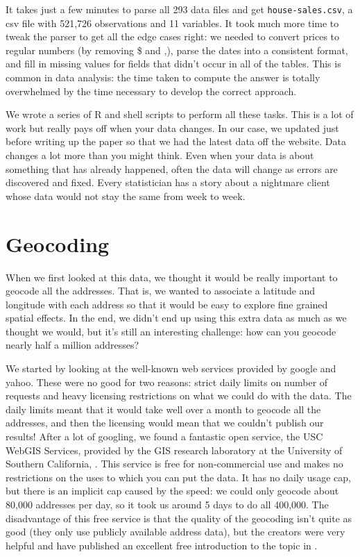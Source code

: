 \documentclass[oneside]{article}
\begin{document}
It takes just a few minutes to parse all 293 data files and get {\tt house-sales.csv}, a csv file with 521,726 observations and 11 variables.  It took much more time to tweak the parser to get all the edge cases right: we needed to convert prices to regular numbers (by removing \$ and ,), parse the dates into a consistent format, and fill in missing values for fields that didn't occur in all of the tables.  This is common in data analysis: the time taken to compute the answer is totally overwhelmed by the time necessary to develop the correct approach.

We wrote a series of R and shell scripts to perform all these tasks. This is a lot of work but really pays off when your data changes.  In our case, we updated just before writing up the paper so that we had the latest data off the website.  Data changes a lot more than you might think.  Even when your data is about something that has already happened, often the data will change  as errors are discovered and fixed.  Every statistician has a story about a nightmare client whose data would not stay the same from week to week.

\section{Geocoding} 

When we first looked at this data, we thought it would be really important to geocode all the addresses.  That is, we wanted to associate a latitude and longitude with each address so that it would be easy to explore fine grained spatial effects.  In the end, we didn't end up using this extra data as much as we thought we would, but it's still an interesting challenge: how can you geocode nearly half a million addresses?  

We started by looking at the well-known web services provided by google and yahoo.  These were no good for two reasons: strict daily limits on number of requests and heavy licensing restrictions on what we could do with the data.  The daily limits meant that it would take well over a month to geocode all the addresses, and then the licensing would mean that we couldn't publish our results!  After a lot of googling, we found a fantastic open service, the USC WebGIS Services, provided by the GIS research laboratory at the University of Southern California, \citet{uscgis}.  This service is free for non-commercial use and makes no restrictions on the uses to which you can put the data.  It has no daily usage cap, but there is an implicit cap caused by the speed: we could only geocode about 80,000 addresses per day, so it took us around 5 days to do all 400,000.  The disadvantage of this free service is that the quality of the geocoding isn't quite as good (they only use publicly available address data), but the creators were very helpful and have published an excellent free introduction to the topic in \citet{goldberg:2008}.
\end{document}
